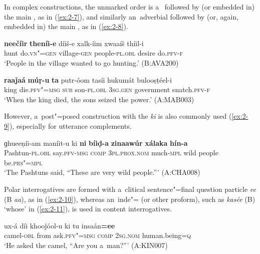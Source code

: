 In complex constructions, the unmarked order is a~ followed by (or embedded in) the main , as in (\ref{ex:2-7}), and similarly an~adverbial  followed by (or, again, embedded in) the main , as in (\ref{ex:2-8}). 

\begin{exe}
\ex
\label{ex:2-7}
\gll \textbf{neečíir} \textbf{theníi-e} díiš-e xalk-íim xwaaíš thíil-i \\
	hunt do.\textsc{vn"=gen} village\textsc{-gen} people\textsc{-pl.obl} desire do.\textsc{pfv-f} \\
\glt `People in the village wanted to go hunting.' (B:AVA200)
\end{exe}

\begin{exe}
\ex
\label{ex:2-8}
\gll \textbf{raaǰaá} \textbf{múṛ-u} \textbf{ta} putr-óom tasíi hukumát bulooṣṭéel-i \\
	king die.\textsc{pfv"=msg} \textsc{sub} son\textsc{-pl.obl} \textsc{3sg.gen} government snatch.\textsc{pfv-f} \\
\glt `When the king died, the sons seized the power.' (A:MAB003)
\end{exe}

However, a~post"=posed construction with the  \textit{ki} is also commonly used (\ref{ex:2-9}), especially for utterance complements.

\begin{exe}
\ex
\label{ex:2-9}
\gll ɡhueeṇíi-am maníit-u ki \textbf{ni} \textbf{bíiḍ-a} \textbf{zinaawúr} \textbf{xálaka} \textbf{hín-a}\\
	Pashtun-\textsc{pl.obl} say.\textsc{pfv-msg} \textsc{comp} \textsc{3pl.prox.nom} much-\textsc{mpl} wild people be.\textsc{prs"=mpl} \\
\glt `The Pashtuns said, ``These are very wild people.''' (A:CHA008)
\end{exe}

Polar interrogatives are formed with a~clitical sentence"=final question particle \textit{ee} (B \textit{aa}), as in (\ref{ex:2-10}), whereas an~inde"=  (or other proform), such as \textit{kasée} (B) `whose' in (\ref{ex:2-11}), is used in content interrogatives. 

\begin{exe}
\ex
\label{ex:2-10}
\gll ux-á díi khooǰóol-u ki tu insaán\textbf{=ee}\\
	camel-\textsc{obl} from ask.\textsc{pfv"=msg} \textsc{comp} \textsc{2sg.nom} human.being=\textsc{q} \\
\glt `He asked the camel, ``Are you a~man?''' (A:KIN007)
\end{exe}


